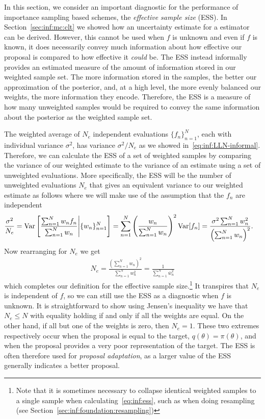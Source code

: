In this section, we consider an important diagnostic for the performance of importance
sampling based schemes, the \emph{effective sample size} (ESS).  In
Section~\ref{sec:inf:mc:clt} we showed how an uncertainty estimate for a \mc
estimator can be derived.  However, this cannot be used when $f$ is unknown
and even if $f$ is known, it does necessarily convey much information about how effective
our proposal is compared to how effective it \emph{could} be.  The ESS instead informally provides an
estimated measure of the amount of information stored in our weighted sample set.
The more information stored in the samples, the better our approximation of the posterior, and,
at a high level, the more evenly balanced our weights, the more information they encode.
Therefore, the ESS is a measure of how many unweighted samples would be required to
convey the same information about the posterior as the weighted sample set.

The weighted average of $N_e$ independent evaluations $\{f_n\}_{n=1}^N$, each 
with individual variance $\sigma^2$,
has variance $\sigma^2 / N_e$ as we showed in~\eqref{eq:inf:LLN-informal}.  Therefore,
we can calculate the ESS of a set of weighted samples by comparing the variance of our 
weighted estimate to the variance of an estimate using a
set of unweighted evaluations. More specifically, the ESS will be the number of unweighted evaluations
$N_e$ that gives an equivalent variance to our weighted estimate as follows where we
will make use of the assumption that the $f_n$ are independent
\begin{align}
\frac{\sigma^2}{N_e} &= \mathrm{Var} \left[\frac{\sum_{n=1}^{N} w_n f_n}{\sum_{n=1}^{N} w_n} \middle| 
														\{w_n\}_{n=1}^N\right] = \sum_{n=1}^{N} \left(\frac{w_n}{\sum_{n=1}^{N} w_n} \right)^2 \mathrm{Var} [f_n] 
														= \frac{\sigma^2\sum_{n=1}^{N} w_n^2}{\left(\sum_{n=1}^{N} w_n\right)^2}.
\end{align}
Now rearranging for $N_e$ we get
\begin{align}
\label{eq:inf:ess}
N_e = \frac{\left(\sum_{n=1}^{N} w_n\right)^2}{\sum_{n=1}^{N} w_n^2} = \frac{1}{\sum_{n=1}^{N} \bar{w}_n^2}
\end{align}
which completes our definition for the effective sample size.\footnote{Note that it is sometimes necessary
	to collapse identical weighted samples to a single sample when
	calculating~\eqref{eq:inf:ess}, such as when doing resampling (see Section~\ref{sec:inf:foundation:resampling})
	}
It transpires that $N_e$ is
independent of $f$, so we can still use the ESS as a diagnostic when $f$ is unknown.
It is straightforward to show using Jensen's inequality we have that $N_e\le N$ with equality
holding if and only if all the weights are equal.  On the other hand, if all but one of the weights
is zero, then $N_e=1$.  These two extremes respectively occur when the proposal
is equal to the target, $q(\theta)=\pi(\theta)$, and when the proposal provides a very poor
representation of the target.  The ESS is often therefore used for \emph{proposal adaptation},
as a larger value of the ESS generally indicates a better proposal.

